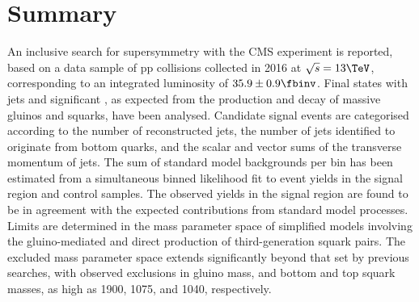 
\section{Summary}
\label{sec:summary}

An inclusive search for supersymmetry with the CMS experiment is
reported, based on a data sample of pp collisions collected in 2016 at
$\sqrt{s} = 13\TeV$, corresponding to an integrated luminosity of
$35.9 \pm 0.9 \fbinv$. Final states with jets and significant
\ptvecmiss, as expected from the production and decay of massive
gluinos and squarks, have been analysed. Candidate signal events are
categorised according to the number of reconstructed jets, the number
of jets identified to originate from bottom quarks, and the scalar and
vector sums of the transverse momentum of jets. The sum of standard
model backgrounds per bin has been estimated from a simultaneous
binned likelihood fit to event yields in the signal region and control
samples. The observed yields in the signal region are found to be in
agreement with the expected contributions from standard model
processes. Limits are determined in the mass parameter space of
simplified models involving the gluino-mediated and direct production
of third-generation squark pairs. The excluded mass parameter space
extends significantly beyond that set by previous searches, with
observed exclusions in gluino mass, and bottom and top squark masses,
as high as 1900, 1075, and 1040\GeV, respectively.


\clearpage









